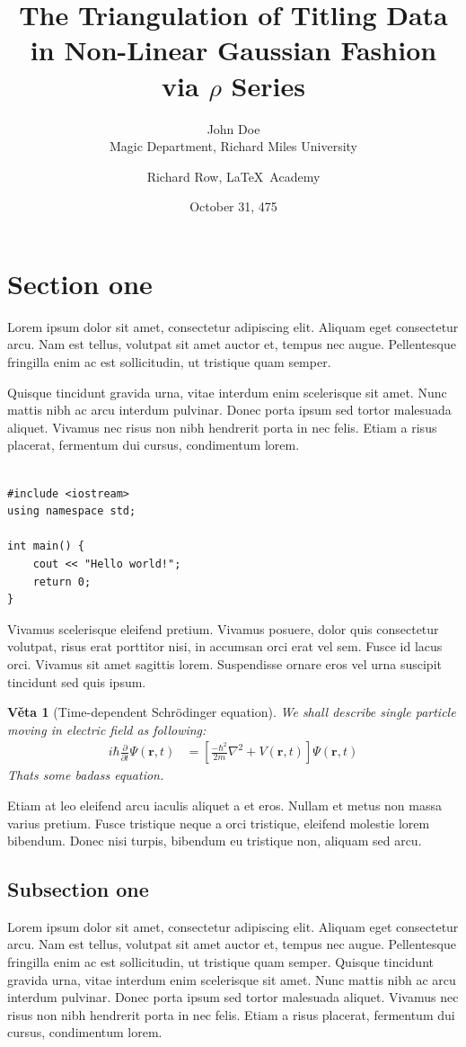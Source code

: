 \documentclass[12pt,a4paper]{article}
\title{The Triangulation of Titling Data in
       Non-Linear Gaussian Fashion via $\rho$ Series}
\date{October 31, 475}
\author{John Doe\\ Magic Department, Richard Miles University
        \and Richard Row, \LaTeX\ Academy}
\newtheorem{theorem}{Věta}
\theoremstyle{definition}
\begin{document}
\maketitle

\tableofcontents
\newpage

\section{Section one}
Lorem ipsum dolor sit amet, consectetur adipiscing elit. Aliquam eget consectetur arcu. Nam est tellus, volutpat sit amet auctor et, tempus nec augue. Pellentesque fringilla enim ac est sollicitudin, ut tristique quam semper. 


Quisque tincidunt gravida urna, vitae interdum enim scelerisque sit amet. Nunc mattis nibh ac arcu interdum pulvinar. Donec porta ipsum sed tortor malesuada aliquet. Vivamus nec risus non nibh hendrerit porta in nec felis. Etiam a risus placerat, fermentum dui cursus, condimentum lorem.

\begin{verbatim}

#include <iostream>
using namespace std;

int main() {
	cout << "Hello world!";
	return 0;
}

\end{verbatim}

Vivamus scelerisque eleifend pretium. Vivamus posuere, dolor quis consectetur volutpat, risus erat porttitor nisi, in accumsan orci erat vel sem. Fusce id lacus orci. Vivamus sit amet sagittis lorem. Suspendisse ornare eros vel urna suscipit tincidunt sed quis ipsum. 

\begin{theorem}[Time-dependent Schrödinger equation]
We shall describe single particle moving in electric field as following:
\begin{align*}
	i\hbar\frac{\partial}{\partial t} \Psi(\mathbf{r},t) &= \left[ \frac{-\hbar^2}{2m}\nabla^2 + V(\mathbf{r},t)\right] \Psi(\mathbf{r},t)
\end{align*}
Thats some badass equation.
\end{theorem}

Etiam at leo eleifend arcu iaculis aliquet a et eros. Nullam et metus non massa varius pretium. Fusce tristique neque a orci tristique, eleifend molestie lorem bibendum. Donec nisi turpis, bibendum eu tristique non, aliquam sed arcu.

\subsection{Subsection one}
Lorem ipsum dolor sit amet, consectetur adipiscing elit. Aliquam eget consectetur arcu. Nam est tellus, volutpat sit amet auctor et, tempus nec augue. Pellentesque fringilla enim ac est sollicitudin, ut tristique quam semper. Quisque tincidunt gravida urna, vitae interdum enim scelerisque sit amet. Nunc mattis nibh ac arcu interdum pulvinar. Donec porta ipsum sed tortor malesuada aliquet. Vivamus nec risus non nibh hendrerit porta in nec felis. Etiam a risus placerat, fermentum dui cursus, condimentum lorem.
\end{document}
